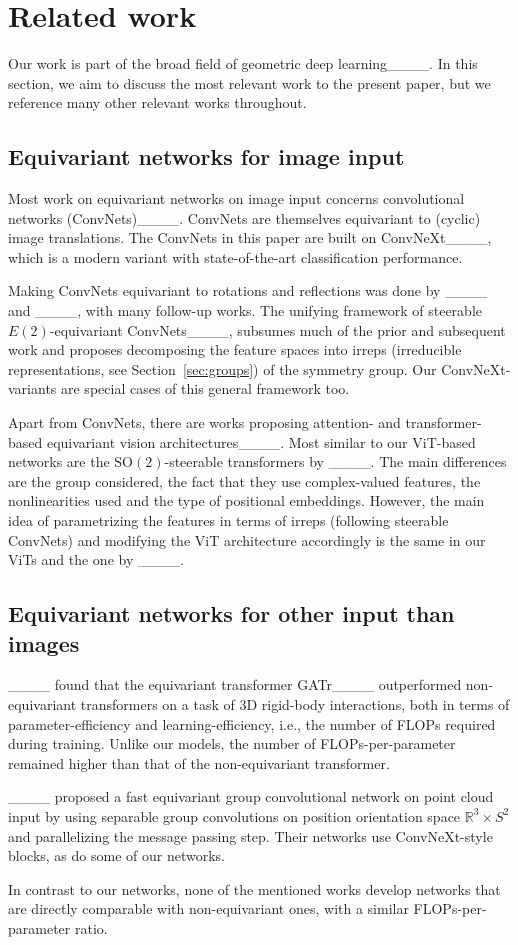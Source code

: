 \section{Related work}
%
\label{sec:related_work}
Our work is part of the broad field of geometric deep learning____.
In this section, we aim to discuss the most relevant work to the present paper, but we reference many other relevant works throughout.

\subsection{Equivariant networks for image input}\label{sec:equi_image}
Most work on equivariant networks on image input concerns convolutional networks (ConvNets)____.
ConvNets are themselves equivariant to (cyclic) image translations.
The ConvNets in this paper are built on ConvNeXt____, which is a modern variant with state-of-the-art classification performance.

Making ConvNets equivariant to rotations and reflections was done by ____ and ____, with many follow-up works.
The unifying framework of steerable $E(2)$-equivariant ConvNets____, subsumes much of the prior and subsequent work and proposes decomposing the feature spaces into irreps (irreducible representations, see Section~\ref{sec:groups}) of the symmetry group.
Our ConvNeXt-variants are special cases of this general framework too.

Apart from ConvNets, there are works proposing attention- and transformer-based equivariant vision architectures____.
Most similar to our ViT-based networks are the $\mathrm{SO}(2)$-steerable transformers by ____.
The main differences are the group considered, the fact that they use complex-valued features, the nonlinearities used and the type of positional embeddings.
However, the main idea of parametrizing the features in terms of irreps (following steerable ConvNets) and modifying the ViT architecture accordingly is the same in our ViTs and the one by ____.


\subsection{Equivariant networks for other input than images}

____ found that the equivariant transformer GATr____ outperformed non-equivariant transformers on a task of 3D rigid-body interactions, both in terms of parameter-efficiency and learning-efficiency, i.e., the number of FLOPs required during training.
Unlike our models, the number of FLOPs-per-parameter remained higher than that of the non-equivariant transformer.


____ proposed a fast equivariant group convolutional network on point cloud input by using separable group convolutions on position orientation space $\mathbb{R}^3 \times S^2$ and parallelizing the message passing step. 
Their networks use ConvNeXt-style blocks, as do some of our networks.

In contrast to our networks, none of the mentioned works develop networks that are directly comparable with non-equivariant ones, with a similar FLOPs-per-parameter ratio.